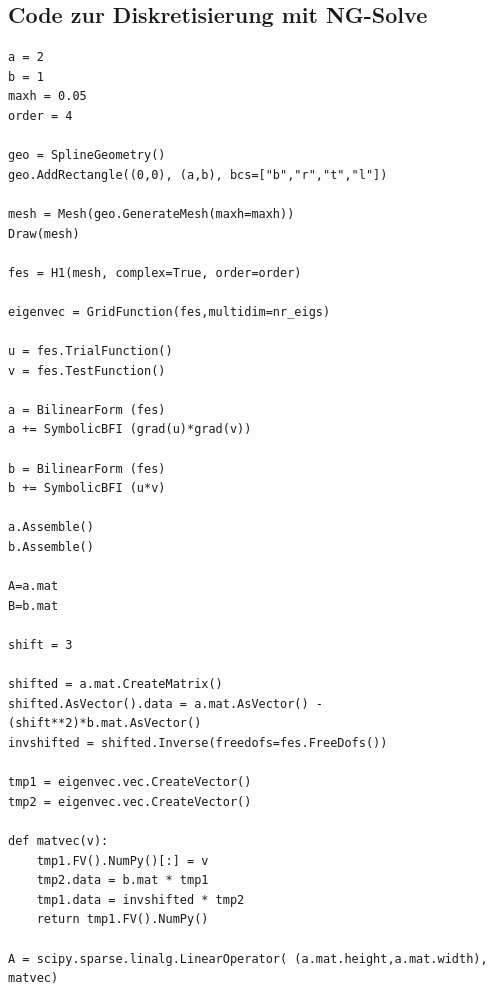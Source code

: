 \documentclass{article}
\theoremstyle{plain}
\begin{document}
\subsection*{Code zur Diskretisierung mit NG-Solve}


\begin{lstlisting}
a = 2
b = 1
maxh = 0.05
order = 4

geo = SplineGeometry()
geo.AddRectangle((0,0), (a,b), bcs=["b","r","t","l"])

mesh = Mesh(geo.GenerateMesh(maxh=maxh))
Draw(mesh)

fes = H1(mesh, complex=True, order=order)

eigenvec = GridFunction(fes,multidim=nr_eigs)

u = fes.TrialFunction()
v = fes.TestFunction()

a = BilinearForm (fes)
a += SymbolicBFI (grad(u)*grad(v))

b = BilinearForm (fes)
b += SymbolicBFI (u*v)

a.Assemble()
b.Assemble()

A=a.mat
B=b.mat

shift = 3

shifted = a.mat.CreateMatrix()
shifted.AsVector().data = a.mat.AsVector() - (shift**2)*b.mat.AsVector()
invshifted = shifted.Inverse(freedofs=fes.FreeDofs())

tmp1 = eigenvec.vec.CreateVector()
tmp2 = eigenvec.vec.CreateVector()

def matvec(v):
    tmp1.FV().NumPy()[:] = v
    tmp2.data = b.mat * tmp1
    tmp1.data = invshifted * tmp2
    return tmp1.FV().NumPy()

A = scipy.sparse.linalg.LinearOperator( (a.mat.height,a.mat.width), matvec)
\end{lstlisting}
\newpage

\printbibliography
\end{document}
